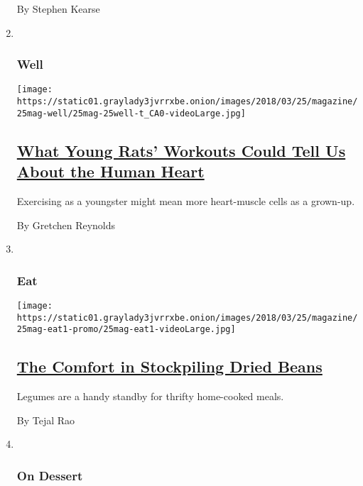 \begin{enumerate}
  By Stephen Kearse
\item ~
  \hypertarget{well}{%
  \subsubsection{Well}\label{well}}

  \texttt{[image: https://static01.graylady3jvrrxbe.onion/images/2018/03/25/magazine/25mag-well/25mag-25well-t\_CA0-videoLarge.jpg]}

  \hypertarget{what-young-rats-workouts-could-tell-us-about-the-human-heart}{%
  \subsection{\texorpdfstring{\href{/2018/03/20/well/move/what-young-rats-workouts-could-tell-us-about-the-human-heart.html}{What
  Young Rats' Workouts Could Tell Us About the Human
  Heart}}{What Young Rats' Workouts Could Tell Us About the Human Heart}}\label{what-young-rats-workouts-could-tell-us-about-the-human-heart}}

  Exercising as a youngster might mean more heart-muscle cells as a
  grown-up.

  By Gretchen Reynolds
\item ~
  \hypertarget{eat}{%
  \subsubsection{Eat}\label{eat}}

  \texttt{[image: https://static01.graylady3jvrrxbe.onion/images/2018/03/25/magazine/25mag-eat1-promo/25mag-eat1-videoLarge.jpg]}

  \hypertarget{the-comfort-in-stockpiling-dried-beans}{%
  \subsection{\texorpdfstring{\href{/2018/03/20/magazine/dried-beans-garlic-toast-broth-recipe.html}{The
  Comfort in Stockpiling Dried
  Beans}}{The Comfort in Stockpiling Dried Beans}}\label{the-comfort-in-stockpiling-dried-beans}}

  Legumes are a handy standby for thrifty home-cooked meals.

  By Tejal Rao
\item ~
  \hypertarget{on-dessert}{%
  \subsubsection{On Dessert}\label{on-dessert}}


\end{enumerate}
